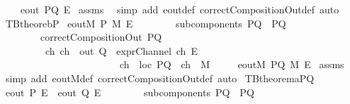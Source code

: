 \begin{isabellebody}
\ \ \ \ {\isachardoublequoteopen}eout\ PQ\ E{\isachardoublequoteclose}\isanewline
%
\isadelimproof
%
\endisadelimproof
%
\isatagproof
{}\isamarkupfalse%
\ assms\ \isamarkupfalse%
\ {\isacharparenleft}simp\ add{\isacharcolon}\ eout{\isacharunderscore}def\ correctCompositionOut{\isacharunderscore}def{\isacharcomma}\ auto{\isacharparenright}%
\endisatagproof
{\isafoldproof}%
%
\isadelimproof
\isanewline
%
\endisadelimproof
\isanewline
{}\isamarkupfalse%
\ TBtheore{}{}b{\isacharunderscore}P{\isacharcolon}\isanewline
{}\ {\isachardoublequoteopen}eoutM\ P\ M\ E{\isachardoublequoteclose}\isanewline
\ \ \ \ \ \ \ \ {\isachardoublequoteopen}subcomponents\ PQ\ {\isacharequal}\ {\isacharbraceleft}P{\isacharcomma}Q{\isacharbraceright}{\isachardoublequoteclose}\isanewline
\ \ \ \ \ \ \ \ {\isachardoublequoteopen}correctCompositionOut\ PQ{\isachardoublequoteclose}\ \isanewline
\ \ \ \ \ \ \ \ {\isachardoublequoteopen}{\isasymexists}\ ch{\isachardot}\ {\isacharparenleft}{\isacharparenleft}ch\ {\isasymin}\ {\isacharparenleft}out\ Q{\isacharparenright}{\isacharparenright}\ {\isasymand}\ {\isacharparenleft}exprChannel\ ch\ E{\isacharparenright}\ {\isasymand}\ \isanewline
\ \ \ \ \ \ \ \ \ \ \ \ \ \ \ \ \ \ \ \ \ \ \ \ {\isacharparenleft}ch\ {\isasymnotin}\ {\isacharparenleft}loc\ PQ{\isacharparenright}{\isacharparenright}\ {\isasymand}\ {\isacharparenleft}ch\ {\isasymin}\ M{\isacharparenright}\ {\isacharparenright}{\isachardoublequoteclose}\isanewline
{}\ \ \ \ {\isachardoublequoteopen}eoutM\ PQ\ M\ E{\isachardoublequoteclose}\isanewline
%
\isadelimproof
%
\endisadelimproof
%
\isatagproof
{}\isamarkupfalse%
\ assms\ \isamarkupfalse%
\ {\isacharparenleft}simp\ add{\isacharcolon}\ eoutM{\isacharunderscore}def\ correctCompositionOut{\isacharunderscore}def{\isacharcomma}\ auto{\isacharparenright}%
\endisatagproof
{\isafoldproof}%
%
\isadelimproof
\isanewline
%
\endisadelimproof
\isanewline
{}\isamarkupfalse%
\ TBtheorem{}a{\isacharunderscore}PQ{\isacharcolon}\isanewline
{}\ {\isachardoublequoteopen}{\isacharparenleft}eout\ P\ E{\isacharparenright}\ {\isasymor}\ {\isacharparenleft}eout\ Q\ E{\isacharparenright}{\isachardoublequoteclose}\isanewline
\ \ \ \ \ \ \ \ {\isachardoublequoteopen}subcomponents\ PQ\ {\isacharequal}\ {\isacharbraceleft}P{\isacharcomma}Q{\isacharbraceright}{\isachardoublequoteclose}\isanewline

\end{isabellebody}
